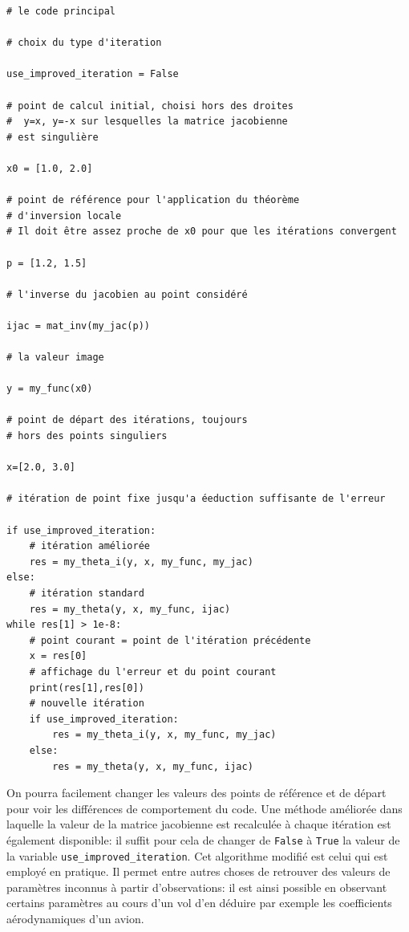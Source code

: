 \begin{verbatim}
# le code principal

# choix du type d'iteration

use_improved_iteration = False

# point de calcul initial, choisi hors des droites
#  y=x, y=-x sur lesquelles la matrice jacobienne 
# est singulière

x0 = [1.0, 2.0]

# point de référence pour l'application du théorème 
# d'inversion locale
# Il doit être assez proche de x0 pour que les itérations convergent

p = [1.2, 1.5]

# l'inverse du jacobien au point considéré

ijac = mat_inv(my_jac(p))

# la valeur image

y = my_func(x0)

# point de départ des itérations, toujours 
# hors des points singuliers

x=[2.0, 3.0]

# itération de point fixe jusqu'a éeduction suffisante de l'erreur

if use_improved_iteration:
    # itération améliorée
    res = my_theta_i(y, x, my_func, my_jac)
else:
    # itération standard
    res = my_theta(y, x, my_func, ijac)
while res[1] > 1e-8:
    # point courant = point de l'itération précédente
    x = res[0]
    # affichage du l'erreur et du point courant
    print(res[1],res[0])
    # nouvelle itération
    if use_improved_iteration:
        res = my_theta_i(y, x, my_func, my_jac)
    else:
        res = my_theta(y, x, my_func, ijac)
\end{verbatim}
On pourra facilement changer les valeurs des points de référence et de départ pour voir les différences de comportement du code.
Une méthode améliorée dans laquelle la valeur de la matrice jacobienne est recalculée à chaque itération est également disponible: il suffit pour cela de changer de \texttt{False} à \texttt{True} la valeur de la variable \texttt{use\_improved\_iteration}. Cet algorithme modifié est celui qui est employé en pratique. Il permet entre autres choses de retrouver des valeurs de paramètres inconnus à partir d'observations: il est ainsi possible en observant certains paramètres au cours d'un vol d'en déduire par exemple les coefficients aérodynamiques d'un avion. 
\vskip 12pt
\vskip 12pt
